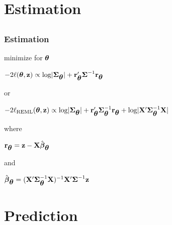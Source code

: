 \documentclass[mathserif,compress]{beamer}\usepackage{graphicx, color}
\def\br{\mathbf{r}}
\def\bz{\mathbf{z}}
\def\bX{\mathbf{X}}
\def\bbeta{\mbox{\boldmath $\beta$}}
\def\btheta{\mbox{\boldmath $\theta$}}
\def\bSigma{\mbox{\boldmath $\Sigma$}}
\def\log{\textrm{log}}
\def\upp{^\prime}
\def\upi{^{-1}}
\begin{document}
\begin{frame}[fragile]
\begin{tabular} {p{4.5cm} p{4.5cm}}
	\end{tabular}

\end{frame}


\section{Estimation}
\subsection{}
\begin{frame}[fragile]
\frametitle{Estimation}

minimize for $\btheta$ \\
\begin{center}
	$-2\ell(\btheta,\bz) \propto \log|\bSigma_{\btheta}| + \br_{\btheta}\upp\bSigma\upi\br_{\btheta}$
\end{center}
or
\begin{center}
	$-2\ell_{\textrm{REML}}(\btheta,\bz) \propto \log|\bSigma_{\btheta}| + \br_{\btheta}\upp\bSigma_{\btheta}\upi\br_{\btheta} + \log|\bX\upp\bSigma_{\btheta}\upi\bX|$
\end{center}
where
\begin{center}
	$\br_{\btheta} = \bz - \bX\hat{\bbeta}_{\btheta}$
\end{center}
and
\begin{center}
	$\hat{\bbeta}_{\btheta} = (\bX\upp\bSigma_{\btheta}\upi\bX)\upi\bX\upp\bSigma\upi\bz$
\end{center}

\end{frame}

\section{Prediction}
\end{document}
